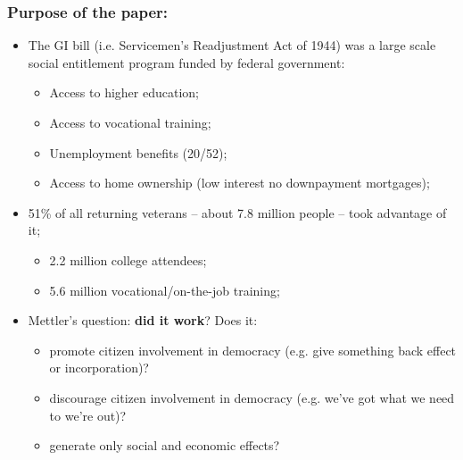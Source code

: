 \documentclass[aspectratio=169]{beamer}
\theoremstyle{principle}
\begin{document}
\begin{frame}
\frametitle{Purpose of the paper:}
\begin{itemize}
\item The GI bill (i.e. Servicemen's Readjustment Act of 1944) was a large scale social entitlement program funded by federal government:
\begin{itemize}
\item Access to higher education;
\item Access to vocational training;
\item Unemployment benefits (20/52);
\item Access to home ownership (low interest no downpayment mortgages);
\end{itemize}
\bigskip
\bigskip
\item 51\% of all returning veterans -- about 7.8 million people -- took advantage of it;
\begin{itemize}
\item 2.2 million college attendees;
\item 5.6 million vocational/on-the-job training;
\end{itemize}
\bigskip
\bigskip
\item Mettler's question: \textbf{did it work}? Does it:
\begin{itemize}
\item promote citizen involvement in democracy (e.g. give something back effect or incorporation)?
\item discourage citizen involvement in democracy (e.g. we've got what we need to we're out)?
\item generate only social and economic effects?
\end{itemize}
\end{itemize}
\end{frame}
\end{document}
